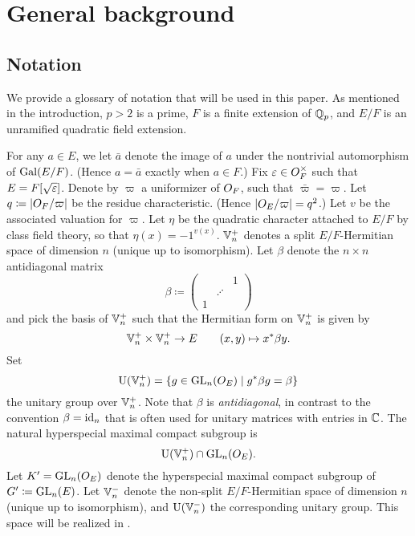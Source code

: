 \chapter{General background}
\label{ch:background}

\section{Notation}
We provide a glossary of notation that will be used in this paper.
As mentioned in the introduction, $p > 2$ is a prime,
$F$ is a finite extension of $\mathbb Q_p$,
and $E/F$ is an unramified quadratic field extension.

\begin{itemize}
  \ii For any $a \in E$, we let $\bar a$ denote the image of $a$
  under the nontrivial automorphism of $\operatorname{Gal}(E/F)$.
  (Hence $a = \bar a$ exactly when $a \in F$.)
  \ii Fix $\varepsilon \in O_F^\times$ such that $E = F[\sqrt{\varepsilon}]$.
  \ii Denote by $\varpi$ a uniformizer of $O_F$, such that $\bar \varpi = \varpi$.
  \ii Let $q \coloneqq |O_F/\varpi|$ be the residue characteristic.
  (Hence $|O_E / \varpi| = q^2$.)
  \ii Let $v$ be the associated valuation for $\varpi$.
  \ii Let $\eta$ be the quadratic character attached to $E/F$ by class field theory,
  so that $\eta(x) = -1^{v(x)}$.
  \ii $\mathbb V_n^+$ denotes a split $E/F$-Hermitian space of dimension $n$ (unique up to isomorphism).
  \ii Let $\beta$ denote the $n \times n$ antidiagonal matrix
  \[ \beta \coloneqq \begin{pmatrix} && 1 \\ & \iddots \\ 1 \end{pmatrix} \]
  and pick the basis of $\mathbb V_n^+$ such that the Hermitian form on $\mathbb V_n^+$ is given by
  \[ \mathbb V_n^+ \times \mathbb V_n^+ \to E \qquad (x,y) \mapsto x^\ast \beta y. \]
  \ii Set
  \[ \operatorname{U}(\mathbb V_n^+) = \{ g \in \operatorname{GL}_n(O_E) \mid g^\ast \beta g = \beta\} \]
  the unitary group over $\mathbb V_n^+$.
  Note that $\beta$ is \emph{antidiagonal}, in contrast to the convention $\beta = \operatorname{id}_n$
  that is often used for unitary matrices with entries in $\mathbb C$.
  The natural hyperspecial maximal compact subgroup
  is \[ \operatorname{U}(\mathbb V_n^+) \cap \operatorname{GL}_n(O_E). \]
  \ii Let $K' = \operatorname{GL}_n(O_E)$ denote the hyperspecial maximal compact subgroup of $G' \coloneqq \operatorname{GL}_n(E)$.
  \ii Let $\mathbb V_n^-$ denote the non-split $E/F$-Hermitian space of dimension $n$
  (unique up to isomorphism), and $\operatorname{U}(\mathbb V_n^-)$ the corresponding unitary group.
  This space will be realized in .
\end{itemize}

